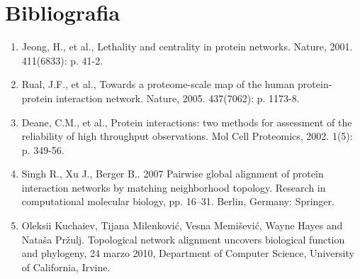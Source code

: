 \documentclass[11pt]{article}
\begin{document}
\section{Bibliografia} 
\begin{enumerate}
\item Jeong, H., et al., Lethality and centrality in protein networks. Nature, 2001. 411(6833): p. 41-2.

\item Rual, J.F., et al., Towards a proteome-scale map of the human protein-protein interaction network. Nature, 2005. 437(7062): p. 1173-8.

\item Deane, C.M., et al., Protein interactions: two methods for assessment of the reliability of high throughput observations. Mol Cell Proteomics, 2002. 1(5): p. 349-56.

\item Singh R., Xu J., Berger B.. 2007 Pairwise global alignment of protein interaction networks by matching neighborhood topology. Research in computational molecular biology, pp. 16–31. Berlin, Germany: Springer.

\item Oleksii Kuchaiev, Tijana Milenković, Vesna Memišević, Wayne Hayes and Nataša Pržulj. Topological network alignment uncovers biological function and phylogeny, 24 marzo 2010, Department of Computer Science, University of California, Irvine.


\end{enumerate}
\end{document}
